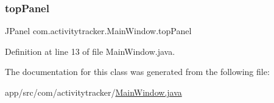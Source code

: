 \subsubsection{\texorpdfstring{top\+Panel}{topPanel}}
{\footnotesize\ttfamily J\+Panel com.\+activitytracker.\+Main\+Window.\+top\+Panel\hspace{0.3cm}{\ttfamily [private]}}



Definition at line 13 of file Main\+Window.\+java.



The documentation for this class was generated from the following file\+:\begin{DoxyCompactItemize}
\item 
app/src/com/activitytracker/\mbox{\hyperlink{_main_window_8java}{Main\+Window.\+java}}\end{DoxyCompactItemize}
